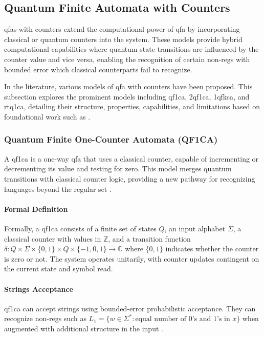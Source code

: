 \subsection{Quantum Finite Automata with Counters}
\label{sec:qfa-with-counters}

\glspl{qfa} with counters extend the computational power of \gls{qfa} by incorporating classical or quantum counters into the system. These models provide hybrid computational capabilities where quantum state transitions are influenced by the counter value and vice versa, enabling the recognition of certain non-\glspl{reg} with bounded error which classical counterparts fail to recognize.

In the literature, various models of \gls{qfa} with counters have been proposed. This subsection explores the prominent models including \gls{qf1ca}, \gls{2qf1ca}, \gls{1qfkca}, and \gls{rtq1ca}, detailing their structure, properties, capabilities, and limitations based on foundational work such as \cite{bonner2001quantum, kravtsev1999quantum, pani2011empowering, cem2012quantum}.

\subsubsection{Quantum Finite One-Counter Automata (QF1CA)}

A \gls{qf1ca} is a one-way \gls{qfa} that uses a classical counter, capable of incrementing or decrementing its value and testing for zero. This model merges quantum transitions with classical counter logic, providing a new pathway for recognizing languages beyond the regular set \cite{kravtsev1999quantum}.

\paragraph{Formal Definition} 
Formally, a \gls{qf1ca} consists of a finite set of states $Q$, an input alphabet $\Sigma$, a classical counter with values in $\mathbb{Z}$, and a transition function $\delta: Q \times \Sigma \times \{0,1\} \times Q \times \{-1,0,1\} \rightarrow \mathbb{C}$ where $\{0,1\}$ indicates whether the counter is zero or not. The system operates unitarily, with counter updates contingent on the current state and symbol read.

\paragraph{Strings Acceptance} 
\gls{qf1ca} can accept strings using bounded-error probabilistic acceptance. They can recognize non-\glspl{reg} such as $L_1 = \{ w \in \Sigma^* : \text{equal number of 0's and 1's in } x \}$ when augmented with additional structure in the input \cite{bonner2001quantum}.

